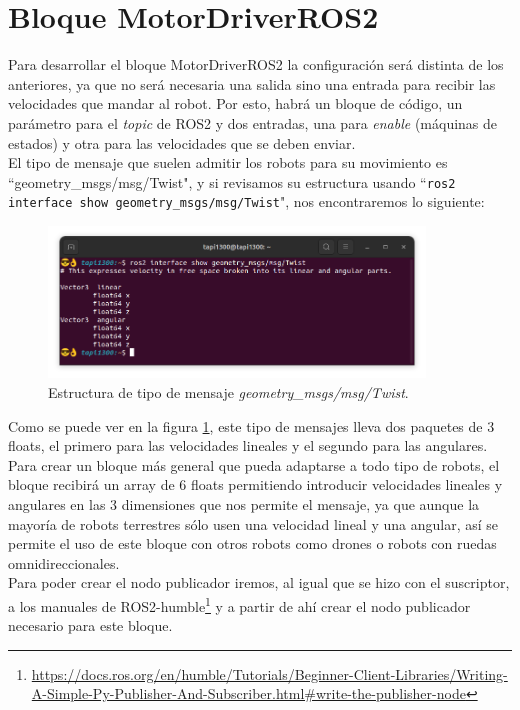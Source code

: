 \section{Bloque MotorDriverROS2}
\label{sec:motordriverros2}
Para desarrollar el bloque MotorDriverROS2 la configuración será distinta de los anteriores, ya que no será necesaria una salida sino una entrada
para recibir las velocidades que mandar al robot. Por esto, habrá un bloque de código, un parámetro para el \textit{topic} de ROS2 y
dos entradas, una para \textit{enable} (máquinas de estados) y otra para las velocidades que se deben enviar.\\

El tipo de mensaje que suelen admitir los robots para su movimiento es ``geometry\_msgs/msg/Twist", y si revisamos su estructura
usando ``\lstinline|ros2 interface show geometry_msgs/msg/Twist|", nos encontraremos lo siguiente:
\begin{figure} [H]
  \begin{center}
      \includegraphics[width=10cm]{figs/c4/twist_struct.png}
  \end{center}
  \caption[Estructura mensaje Twist]{Estructura de tipo de mensaje \textit{geometry\_msgs/msg/Twist}.}
  \label{fig:twist_struct}
\end{figure}

Como se puede ver en la figura \ref{fig:twist_struct}, este tipo de mensajes lleva dos paquetes de 3 floats, el primero para las velocidades
lineales y el segundo para las angulares. Para crear un bloque más general que pueda adaptarse a todo tipo de robots, el bloque recibirá un array
de 6 floats permitiendo introducir velocidades lineales y angulares en las 3 dimensiones que nos permite el mensaje, ya que aunque la mayoría de
robots terrestres sólo usen una velocidad lineal y una angular, así se permite el uso de este bloque con otros robots como drones o robots con ruedas
omnidireccionales.\\

Para poder crear el nodo publicador iremos, al igual que se hizo con el suscriptor, a los manuales de
ROS2-humble\footnote{\url{https://docs.ros.org/en/humble/Tutorials/Beginner-Client-Libraries/Writing-A-Simple-Py-Publisher-And-Subscriber.html\#write-the-publisher-node}}
y a partir de ahí crear el nodo publicador necesario para este bloque.

